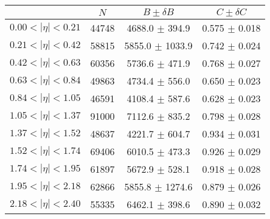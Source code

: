 \begin{tabular}{lccc}
\hline
    &   $N$   & $B \pm \delta B$  &  $C \pm \delta C$ \\
\hline
$0.00 < |\eta| <0.21$          & 44748      & 4688.0     $\pm$ 394.9 & 0.575      $\pm$ 0.018 \\
$0.21 < |\eta| <0.42$          & 58815      & 5855.0     $\pm$ 1033.9 & 0.742      $\pm$ 0.024 \\
$0.42 < |\eta| <0.63$          & 60356      & 5736.6     $\pm$ 471.9 & 0.768      $\pm$ 0.027 \\
$0.63 < |\eta| <0.84$          & 49863      & 4734.4     $\pm$ 556.0 & 0.650      $\pm$ 0.023 \\
$0.84 < |\eta| <1.05$          & 46591      & 4108.4     $\pm$ 587.6 & 0.628      $\pm$ 0.023 \\
$1.05 < |\eta| <1.37$          & 91000      & 7112.6     $\pm$ 835.2 & 0.798      $\pm$ 0.028 \\
$1.37 < |\eta| <1.52$          & 48637      & 4221.7     $\pm$ 604.7 & 0.934      $\pm$ 0.031 \\
$1.52 < |\eta| <1.74$          & 69406      & 6010.5     $\pm$ 473.3 & 0.926      $\pm$ 0.029 \\
$1.74 < |\eta| <1.95$          & 61897      & 5672.9     $\pm$ 528.1 & 0.918      $\pm$ 0.028 \\
$1.95 < |\eta| <2.18$          & 62866      & 5855.8     $\pm$ 1274.6 & 0.879      $\pm$ 0.026 \\
$2.18 < |\eta| <2.40$          & 55335      & 6462.1     $\pm$ 398.6 & 0.890      $\pm$ 0.032 \\
\hline
\end{tabular}
